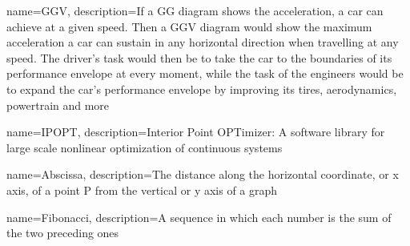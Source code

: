 {
    name=GGV,
    description={If a GG diagram shows the acceleration, a car can achieve at a given speed. Then a GGV diagram would show the maximum acceleration a car can sustain in any horizontal direction when travelling at any speed. The driver's task would then be to take the car to the boundaries of its performance envelope at every moment, while the task of the engineers would be to expand the car's performance envelope by improving its tires, aerodynamics, powertrain and more \cite{the_performance_envelope_or_ggv_diagram}}
}

{
    name=IPOPT,
    description={Interior Point OPTimizer: A software library for large scale nonlinear optimization of continuous systems \cite{ipopt}}
}

{
    name=Abscissa,
    description={The distance along the horizontal coordinate, or x axis, of a point P from the vertical or y axis of a graph \cite{a_dictionary_of_epidemology}}
}

{
    name=Fibonacci,
    description={A sequence in which each number is the sum of the two preceding ones \cite{fibonacci}}
}

